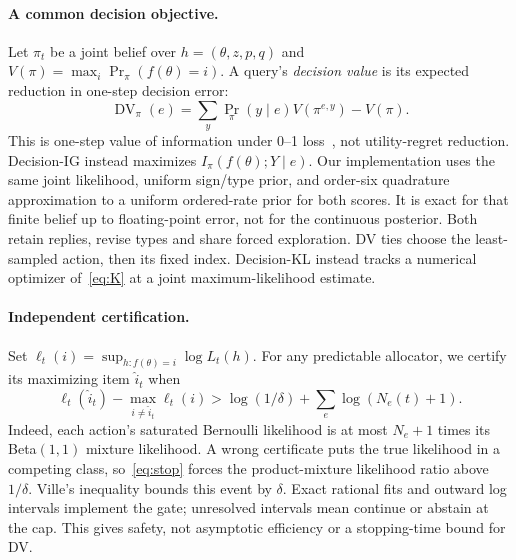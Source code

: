 \documentclass[sigconf,anonymous,review]{acmart}
\begin{document}
\paragraph{A common decision objective.}
Let $\pi_t$ be a joint belief over $h=(\theta,z,p,q)$ and $V(\pi)=\max_i\Pr_\pi(f(\theta)=i)$. A query's \emph{decision value} is its expected reduction in one-step decision error:
\begin{equation}\label{eq:DV}
 \operatorname{DV}_{\pi}(e)=\sum_y\Pr_\pi(y\mid e)V(\pi^{e,y})-V(\pi).
\end{equation}
This is one-step value of information under 0--1 loss~\cite{boutilier2003active}, not utility-regret reduction. Decision-IG instead maximizes $I_\pi(f(\theta);Y\mid e)$. Our implementation uses the same joint likelihood, uniform sign/type prior, and order-six quadrature approximation to a uniform ordered-rate prior for both scores. It is exact for that finite belief up to floating-point error, not for the continuous posterior. Both retain replies, revise types and share forced exploration. DV ties choose the least-sampled action, then its fixed index. Decision-KL instead tracks a numerical optimizer of~\eqref{eq:K} at a joint maximum-likelihood estimate.

\paragraph{Independent certification.}
Set $\ell_t(i)=\sup_{h:f(\theta)=i}\log L_t(h)$. For any predictable allocator, we certify its maximizing item $\widehat i_t$ when
\begin{equation}\label{eq:stop}
 \ell_t(\widehat i_t)-\max_{i\ne\widehat i_t}\ell_t(i)
 >\log(1/\delta)+\sum_e\log(N_e(t)+1).
\end{equation}
Indeed, each action's saturated Bernoulli likelihood is at most $N_e+1$ times its Beta$(1,1)$ mixture likelihood. A wrong certificate puts the true likelihood in a competing class, so~\eqref{eq:stop} forces the product-mixture likelihood ratio above $1/\delta$. Ville's inequality bounds this event by $\delta$. Exact rational fits and outward log intervals implement the gate; unresolved intervals mean continue or abstain at the cap. This gives safety, not asymptotic efficiency or a stopping-time bound for DV.
\end{document}

